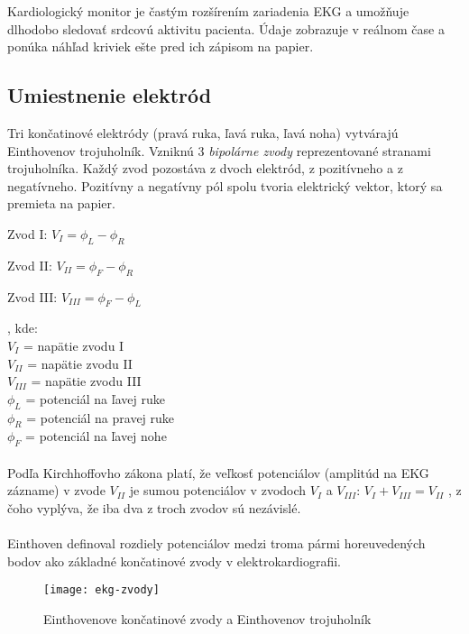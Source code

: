 \documentclass[titlepage]{article}
\begin{document}
Kardiologický monitor je častým rozšírením zariadenia EKG a umožňuje dlhodobo sledovať srdcovú aktivitu pacienta. Údaje zobrazuje v reálnom čase a ponúka náhľad kriviek ešte pred ich zápisom na papier.


\newpage

\subsection{Umiestnenie elektród}
Tri končatinové elektródy (pravá ruka, ľavá ruka, ľavá noha)  vytvárajú Einthovenov trojuholník. Vzniknú 3 \emph{bipolárne zvody} reprezentované stranami trojuholníka. Každý zvod pozostáva z dvoch elektród, z pozitívneho a z negatívneho. Pozitívny a negatívny pól spolu tvoria elektrický vektor, ktorý sa premieta na papier.

\begin{description}
	\item Zvod I: \tabto{1cm} $V_{I} = \phi_L - \phi_R$
	\item Zvod II: \tabto{1cm} $V_{II} = \phi_F - \phi_R$
	\item Zvod III:	\tabto{1cm} $V_{III} = \phi_F - \phi_L$
\end{description}
, kde: \\
\tabto{1cm} $V_{I}$ = napätie zvodu I\\
\tabto{1cm} $V_{II}$ = napätie zvodu II\\
\tabto{1cm} $V_{III}$ = napätie zvodu III\\
\tabto{1cm} $\phi_L$ = potenciál na ľavej ruke\\
\tabto{1cm} $\phi_R$ = potenciál na pravej ruke\\
\tabto{1cm} $\phi_F$ = potenciál na ľavej nohe\\
\\
Podľa Kirchhoffovho zákona platí, že veľkosť potenciálov (amplitúd na EKG zázname) v zvode $V_{II}$ je sumou potenciálov v zvodoch $V_{I}$ a  $V_{III}$:
\tabto{1cm} $V_{I} + V_{III} = V_{II}$
, z čoho vyplýva, že iba dva z troch zvodov sú nezávislé.
\\
\\
Einthoven definoval rozdiely potenciálov medzi troma pármi horeuvedených bodov ako základné končatinové zvody v elektrokardiografii.


\begin{figure}[!ht]
\begin{center}
\texttt{[image: ekg-zvody]}
\caption{Einthovenove končatinové zvody a Einthovenov trojuholník}
\end{center}
\end{figure}
\end{document}
